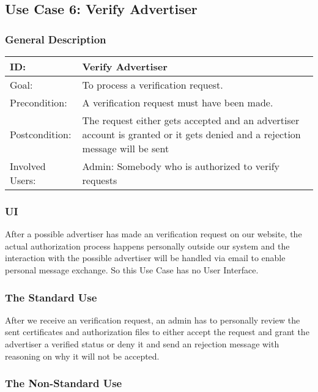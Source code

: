 \subsection{Use Case 6: Verify Advertiser}

\subsubsection{General Description}
\begin{tabular}{|p{.2\linewidth}|p{.65\linewidth}|}
\hline 
ID: & Verify Advertiser \\ \hline
Goal: & To process a verification request. \\ \hline
Precondition: & A verification request must have been made.  \\ \hline
Postcondition: & The request either gets accepted and an advertiser account is granted or it gets denied and a rejection message will be sent \\ \hline
Involved Users: & Admin: Somebody who is authorized to verify requests \\ \hline
\end{tabular}

\subsubsection{UI}

After a possible advertiser has made an verification request on our website, the actual authorization process happens personally outside our system and the interaction with the possible advertiser will be handled via email to enable personal message exchange. So this Use Case has no User Interface.

\subsubsection{The Standard Use}

After we receive an verification request, an admin has to personally review the sent certificates and authorization files to either accept the request and grant the advertiser a verified status or deny it and send an rejection message with reasoning on why it will not be accepted.

\subsubsection{The Non-Standard Use}

